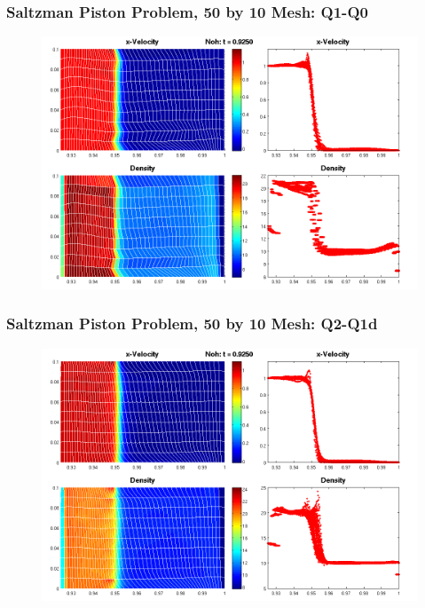 \documentclass[8pt,xcolor=svgnames]{beamer}
\begin{document}
\begin{frame}
 \frametitle{Saltzman Piston Problem, 50 by 10 Mesh: Q1-Q0}
   \begin{figure}[h!]
    \centering
    \includegraphics[width=\textwidth,keepaspectratio=true]{./Images/Saltzman_Q1Q0.png}
    \end{figure}
\end{frame}


\begin{frame}
 \frametitle{Saltzman Piston Problem, 50 by 10 Mesh: Q2-Q1d}
   \begin{figure}[h!]
    \centering
    \includegraphics[width=\textwidth,keepaspectratio=true]{./Images/Saltzman_Q2Q1.png}
    \end{figure}
\end{frame}
\end{document}
